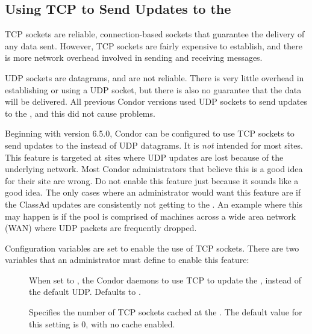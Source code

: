 \subsection{\label{sec:tcp-collector-update}Using TCP to Send Updates to
the }


TCP sockets are reliable, connection-based sockets that guarantee
the delivery of any data sent.
However, TCP sockets are fairly expensive to establish, and there is more
network overhead involved in sending and receiving messages.

UDP sockets are datagrams, and are not reliable.
There is very little overhead in establishing or using a UDP socket,
but there is also no guarantee that the data will be delivered.
All previous Condor versions used UDP sockets to send updates to
the , and this did not cause problems.

Beginning with version 6.5.0, Condor can be configured to use TCP
sockets to send updates to the  instead of
UDP datagrams.
It is \emph{not} intended for most sites.
This feature is targeted at sites where UDP updates are
lost because of the underlying network.
Most Condor administrators that believe this is a good idea for
their site are wrong.
Do not enable this feature just because it sounds like a good idea.
The only cases where an administrator would want this feature are if
the ClassAd updates are consistently not getting to the
.
An example where this may happen is if the pool is comprised of
machines across a wide area network (WAN) where UDP packets are
frequently dropped.

Configuration variables are set to enable the use of TCP sockets.
There are two variables that an
administrator must define to enable this feature:

\begin{description}

\item[]
  When set to , the Condor daemons to use TCP to
  update the , instead of the default UDP.
  Defaults to .

\item[] 
  Specifies the number of TCP sockets cached at the .
  The default value for this setting is 0, with no cache enabled.

\end{description}

